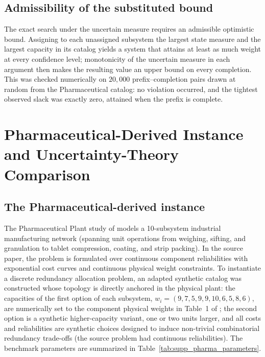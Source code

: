 \documentclass[11pt]{article}
\begin{document}
\subsection{Admissibility of the substituted bound}

The exact search under the uncertain measure requires an admissible optimistic bound. Assigning to each
unassigned subsystem the largest state measure and the largest capacity in its catalog yields a system
that attains at least as much weight at every confidence level; monotonicity of the uncertain measure in
each argument then makes the resulting value an upper bound on every completion. This was checked
numerically on $20{,}000$ prefix--completion pairs drawn at random from the Pharmaceutical catalog: no
violation occurred, and the tightest observed slack was exactly zero, attained when the prefix is
complete.

\section{Pharmaceutical-Derived Instance and Uncertainty-Theory Comparison} \label{sec:supp_pharma}

\subsection{The Pharmaceutical-derived instance} \label{sec:supp_pharma_catalog}

The Pharmaceutical Plant study of \citet{Garg2013} models a 10-subsystem industrial manufacturing network (spanning unit operations from weighing, sifting, and granulation to tablet compression, coating, and strip packing). In the source paper, the problem is formulated over continuous component reliabilities with exponential cost curves and continuous physical weight constraints. To instantiate a discrete redundancy allocation problem, an adapted synthetic catalog was constructed whose topology is directly anchored in the physical plant: the capacities of the first option of each subsystem, $w_i = (9, 7, 5, 9, 9, 10, 6, 5, 8, 6)$, are numerically set to the component physical weights in Table~1 of \citet{Garg2013}; the second option is a synthetic higher-capacity variant, one or two units larger, and all costs and reliabilities are synthetic choices designed to induce non-trivial combinatorial redundancy trade-offs (the source problem had continuous reliabilities). The benchmark parameters are summarized in Table~\ref{tab:supp_pharma_parameters}.
\end{document}
